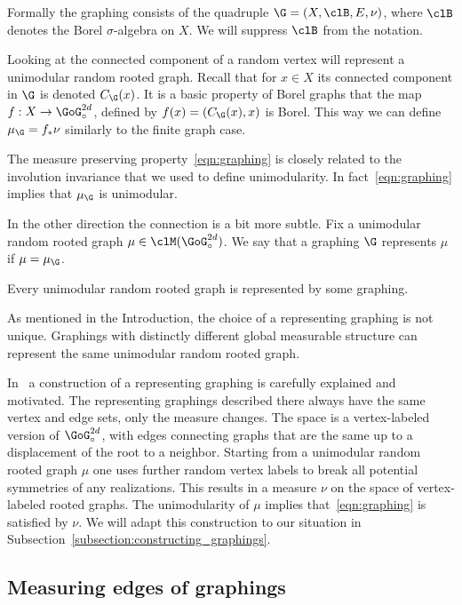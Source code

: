 Formally the graphing consists of the quadruple $\G=(X,\clB, E, \nu)$, where $\clB$ denotes the Borel $\sigma$-algebra on $X$. We will suppress $\clB$ from the notation.

Looking at the connected component of a random vertex will represent a unimodular random rooted graph. Recall that for $x\in X$ its connected component in $\G$ is denoted $C_{\G}(x)$. It is a basic property of Borel graphs that the map $f : X \to \GoG_{\circ}^{2d}$, defined by $f(x)=(C_{\G}(x),x)$ is Borel. This way we can define $\mu_{\G} = f_{*} \nu$ similarly to the finite graph case.

The measure preserving property~\eqref{eqn:graphing} is closely related to the involution invariance that we used to define unimodularity. In fact~\eqref{eqn:graphing} implies that $\mu_{\G}$ is unimodular.

In the other direction the connection is a bit more subtle. Fix a unimodular random rooted graph $\mu \in \clM(\GoG_{\circ}^{2d})$. We say that a graphing $\G$ represents $\mu$ if $\mu=\mu_{\G}$.

\begin{theo} \label{theorem:representing_graphing}
Every unimodular random rooted graph is represented by some graphing.
\end{theo}

As mentioned in the Introduction, the choice of a representing graphing is not unique. Graphings with distinctly different global measurable structure can represent the same unimodular random rooted graph.

In~\cite[Theorem~18.37]{lovasz2012large} a construction of a representing graphing is carefully explained and motivated. The representing graphings described there always have the same vertex and edge sets, only the measure changes. The space is a vertex-labeled version of $\GoG_{\circ}^{2d}$, with edges connecting graphs that are the same up to a displacement of the root to a neighbor. Starting from a unimodular random rooted graph $\mu$ one uses further random vertex labels to break all potential symmetries of any realizations. This results in a measure $\nu$ on the space of vertex-labeled rooted graphs. The unimodularity of $\mu$ implies that~\eqref{eqn:graphing} is satisfied by $\nu$. We will adapt this construction to our situation in Subsection~\ref{subsection:constructing_graphings}.


\subsection{Measuring edges of graphings}

